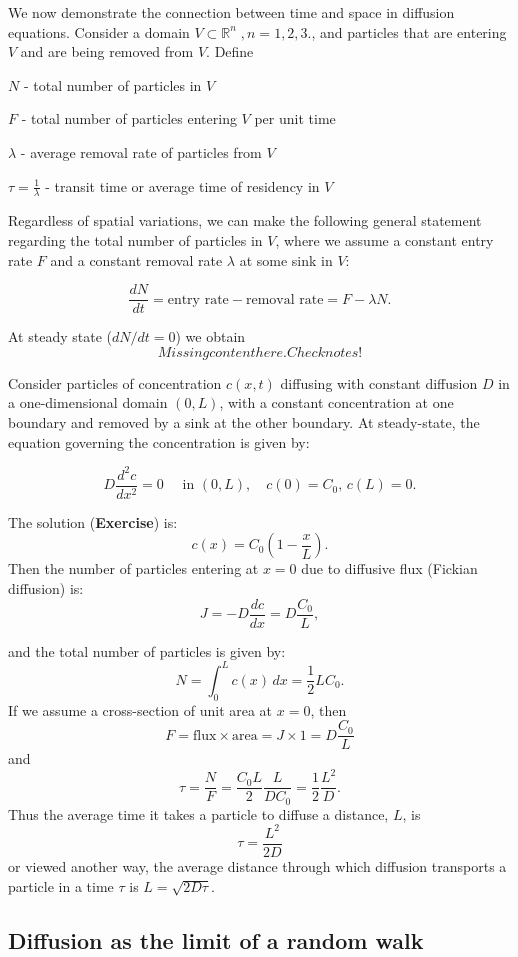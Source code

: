 \documentclass[
  letterpaper,
  DIV=11,
  numbers=noendperiod]{scrreprt}
\theoremstyle{definition}
\theoremstyle{plain}
\theoremstyle{plain}
\theoremstyle{remark}
\begin{document}
We now demonstrate the connection between time and space in diffusion
equations. Consider a domain \(V \subset \mathbb R^n \;, n = 1,2,3.\),
and particles that are entering \(V\) and are being removed from \(V\).
Define

\(N\) - total number of particles in \(V\)

\(F\) - total number of particles entering \(V\) per unit time

\(\lambda\) - average removal rate of particles from \(V\)

\(\tau = \frac 1\lambda\) - transit time or average time of residency in
\(V\)

Regardless of spatial variations, we can make the following general
statement regarding the total number of particles in \(V\), where we
assume a constant entry rate \(F\) and a constant removal rate
\(\lambda\) at some sink in \(V\):

\[
\frac{dN}{dt} = \text{entry rate} - \text{removal rate} = F - \lambda N.
\]

At steady state (\(dN/dt = 0\)) we obtain \[
Missing content here. Check notes!
\]

Consider particles of concentration \(c(x,t)\) diffusing with constant
diffusion \(D\) in a one-dimensional domain \((0,L)\), with a constant
concentration at one boundary and removed by a sink at the other
boundary. At steady-state, the equation governing the concentration is
given by:

\[
D \frac{ d^2 c}{dx^2} = 0  \quad \text{ in } (0,L), \quad c(0) = C_0, \, c(L) = 0 .
\]

The solution (\textbf{Exercise}) is: \[
c(x) = C_0 \left( 1- \frac x L\right).
\] Then the number of particles entering at \(x=0\) due to diffusive
flux (Fickian diffusion) is: \[
J = - D \frac{ dc}{ dx} = D \frac{ C_0} L,  
\]

and the total number of particles is given by: \[
N = \int_0^L c(x) \, dx = \frac 12 L C_0 .
\] If we assume a cross-section of unit area at \(x=0\), then \[
F = \text{flux}\times\text{area} = J\times 1 = D \frac{ C_0} L
\] and \[
\tau =  \frac N F = \frac { C_0 L}{2} \frac L{ DC_0} = \frac 12 \frac{L^2}{D}.
\] Thus the average time it takes a particle to diffuse a distance,
\(L\), is \[
\tau = \dfrac{L^2}{2D}
\] or viewed another way, the average distance through which diffusion
transports a particle in a time \(\tau\) is \(L= \sqrt{ 2D\tau}\).

\hypertarget{diffusion-as-the-limit-of-a-random-walk}{%
\subsection{Diffusion as the limit of a random
walk}\label{diffusion-as-the-limit-of-a-random-walk}}
\end{document}
